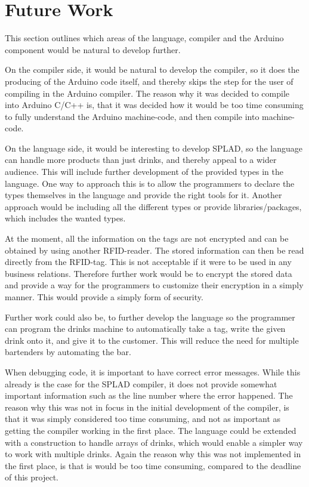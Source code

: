 \section{Future Work} %
This section outlines which areas of the language, compiler and the Arduino component would be natural to develop further.

On the compiler side, it would be natural to develop the compiler, so it does the producing of the Arduino code itself, and thereby skips the step for the user of compiling in the Arduino compiler. The reason why it was decided to compile into Arduino C/C++ is, that it was decided how it would be too time consuming to fully understand the Arduino machine-code, and then compile into machine-code.

On the language side, it would be interesting to develop SPLAD, so the language can handle more products than just drinks, and thereby appeal to a wider audience. This will include further development of the provided types in the language. One way to approach this is to allow the programmers to declare the types themselves in the language and provide the right tools for it. Another approach would be including all the different types or provide libraries/packages, which includes the wanted types.

At the moment, all the information on the tags are not encrypted and can be obtained by using another RFID-reader. The stored information can then be read directly from the RFID-tag. This is not acceptable if it were to be used in any business relations. Therefore further work would be to encrypt the stored data and provide a way for the programmers to customize their encryption in a simply manner. This would provide a simply form of security.

Further work could also be, to further develop the language so the programmer can program the drinks machine to automatically take a tag, write the given drink onto it, and give it to the customer. This will reduce the need for multiple bartenders by automating the bar.

When debugging code, it is important to have correct error messages. While this already is the case for the SPLAD compiler, it does not provide somewhat important information such as the line number where the error happened. The reason why this was not in focus in the initial development of the compiler, is that it was simply considered too time consuming, and not as important as getting the compiler working in the first place. The language could be extended with a construction to handle arrays of drinks, which would enable a simpler way to work with multiple drinks. Again the reason why this was not implemented in the first place, is that is would be too time consuming, compared to the deadline of this project.

